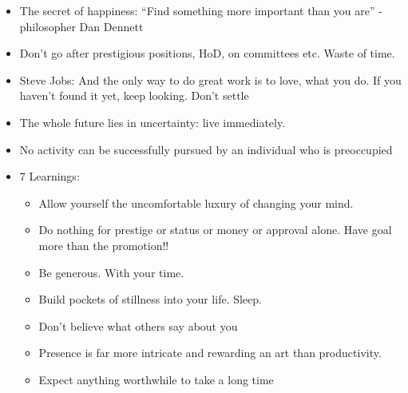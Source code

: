 \begin{itemize}
	\begin{itemize}
	\item  The secret of happiness: ``Find something more important than you are'' - philosopher Dan Dennett
	\item Don't go after prestigious positions, HoD, on committees etc. Waste of time.
	\item Steve Jobs:  And the only way to do great work is to love, what you do. If you haven't found it yet, keep looking. Don't settle
	\item The whole future lies in uncertainty: live immediately.
	\item No activity can be successfully pursued by an individual who is preoccupied 
	\item 7 Learnings:
		\begin{itemize}
		\item Allow yourself the uncomfortable luxury of changing your mind.
		\item Do nothing for prestige or status or money or approval alone. Have goal more than the promotion!!
		\item Be generous. With your time.
		\item Build pockets of stillness into your life. Sleep.
		\item Don't believe what others say about you
		\item Presence is far more intricate and rewarding an art than productivity.
		\item Expect anything worthwhile to take a long time
		\end{itemize}
	\end{itemize}
\end{itemize}
